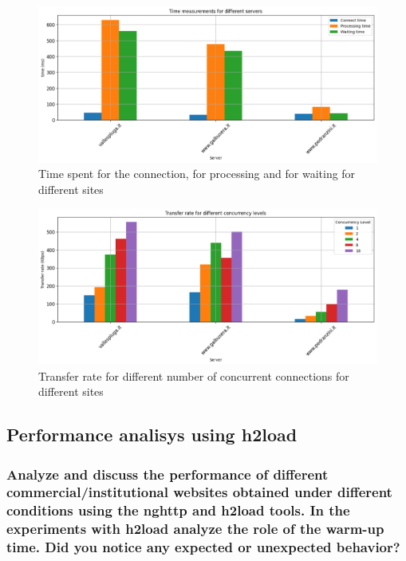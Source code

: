 \documentclass[eng]{class}
\begin{document}
\begin{figure}[H]
  \centering
  \includegraphics[width=\columnwidth]{images/time_diff_server.png}
  \caption{Time spent for the connection, for processing and for waiting for different sites}
  \label{fig-4}
\end{figure}

\begin{figure}[H]
  \centering
  \includegraphics[width=\columnwidth]{images/transf_diff_conc.png}
  \caption{Transfer rate for different number of concurrent connections for different sites}
  \label{fig-5}
\end{figure}
\subsection{Performance analisys using h2load}
\subsubsection*{Analyze and discuss the performance of different commercial/institutional websites obtained
  under different conditions using the nghttp and h2load tools. In the experiments with
  h2load analyze the role of the warm-up time. Did you notice any expected or unexpected
  behavior?}
\end{document}
